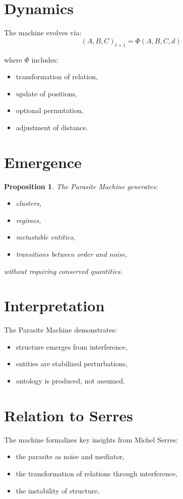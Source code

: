 \documentclass[11pt]{article}
\newtheorem{proposition}{Proposition}
\begin{document}
\section{Dynamics}

The machine evolves via:
\[
(A,B,C)_{t+1} = \Phi(A,B,C,d)
\]

where $\Phi$ includes:
\begin{itemize}
\item transformation of relation,
\item update of positions,
\item optional permutation,
\item adjustment of distance.
\end{itemize}

\section{Emergence}

\begin{proposition}
The Parasite Machine generates:
\begin{itemize}
\item clusters,
\item regimes,
\item metastable entities,
\item transitions between order and noise,
\end{itemize}
without requiring conserved quantities.
\end{proposition}

\section{Interpretation}

The Parasite Machine demonstrates:
\begin{itemize}
\item structure emerges from interference,
\item entities are stabilized perturbations,
\item ontology is produced, not assumed.
\end{itemize}

\section{Relation to Serres}

The machine formalizes key insights from Michel Serres:
\begin{itemize}
\item the parasite as noise and mediator,
\item the transformation of relations through interference,
\item the instability of structure.
\end{itemize}
\end{document}
